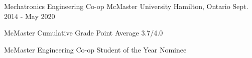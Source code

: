 
\begin{cventries}

  \cventry
    {Mechatronics Engineering Co-op} %
    {McMaster University} %
    {Hamilton, Ontario} %
    {Sept. 2014 - May 2020} %
    {
      \begin{cvitems} %
        \item {McMaster Cumulative Grade Point Average 3.7/4.0}
        \item {McMaster Engineering Co-op Student of the Year Nominee}
      \end{cvitems}
    }


\end{cventries}
